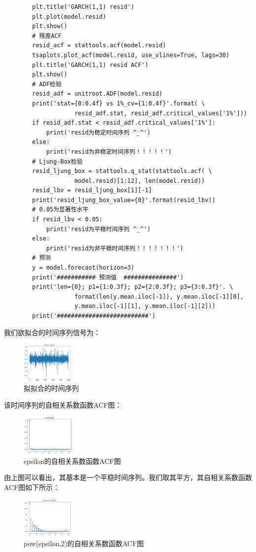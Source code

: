 \documentclass{article}
\begin{document}
\begin{lstlisting}
        plt.title('GARCH(1,1) resid')
        plt.plot(model.resid)
        plt.show()
        # 残差ACF
        resid_acf = stattools.acf(model.resid)
        tsaplots.plot_acf(model.resid, use_vlines=True, lags=30)
        plt.title('GARCH(1,1) resid ACF')
        plt.show()
        # ADF检验
        resid_adf = unitroot.ADF(model.resid)
        print('stat={0:0.4f} vs 1%_cv={1:0.4f}'.format( \
                    resid_adf.stat, resid_adf.critical_values['1%']))
        if resid_adf.stat < resid_adf.critical_values['1%']:
            print('resid为稳定时间序列 ^_^')
        else:
            print('resid为非稳定时间序列！！！！！')
        # Ljung-Box检验
        resid_ljung_box = stattools.q_stat(stattools.acf( \
                    model.resid)[1:12], len(model.resid))
        resid_lbv = resid_ljung_box[1][-1]
        print('resid_ljung_box_value={0}'.format(resid_lbv))
        # 0.05为显著性水平
        if resid_lbv < 0.05:
            print('resid为平稳时间序列 ^_^')
        else:
            print('resid为非平稳时间序列！！！！！！！')
        # 预测
        y = model.forecast(horizon=3)
        print('########### 预测值  ###############')
        print('len={0}; p1={1:0.3f}; p2={2:0.3f}; p3={3:0.3f}'. \
                    format(len(y.mean.iloc[-1]), y.mean.iloc[-1][0], 
                    y.mean.iloc[-1][1], y.mean.iloc[-1][2]))
        print('##########################')
\end{lstlisting}
我们欲拟合的时间序列信号为：
\begin{figure}[H]
	\caption{拟拟合的时间序列}
	\label{f000031}
	\centering
	\includegraphics[height=2cm]{images/f000031}
\end{figure}
该时间序列的自相关系数函数ACF图：
\begin{figure}[H]
	\caption{epsilon的自相关系数函数ACF图}
	\label{f000032}
	\centering
	\includegraphics[height=2cm]{images/f000032}
\end{figure}
由上图可以看出，其基本是一个平稳时间序列。我们取其平方，其自相关系数函数ACF图如下所示：
\begin{figure}[H]
	\caption{pow(epsilon,2)的自相关系数函数ACF图}
	\label{f000033}
	\centering
	\includegraphics[height=2cm]{images/f000033}
\end{figure}
\end{document}
